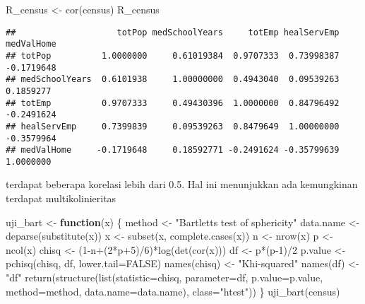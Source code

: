 \documentclass[
]{article}
\newenvironment{Shaded}{\begin{snugshade}}{\end{snugshade}}
\newcommand{\AttributeTok}[1]{\textcolor[rgb]{0.77,0.63,0.00}{#1}}
\newcommand{\ConstantTok}[1]{\textcolor[rgb]{0.00,0.00,0.00}{#1}}
\newcommand{\ControlFlowTok}[1]{\textcolor[rgb]{0.13,0.29,0.53}{\textbf{#1}}}
\newcommand{\DecValTok}[1]{\textcolor[rgb]{0.00,0.00,0.81}{#1}}
\newcommand{\FunctionTok}[1]{\textcolor[rgb]{0.00,0.00,0.00}{#1}}
\newcommand{\NormalTok}[1]{#1}
\newcommand{\OtherTok}[1]{\textcolor[rgb]{0.56,0.35,0.01}{#1}}
\newcommand{\SpecialCharTok}[1]{\textcolor[rgb]{0.00,0.00,0.00}{#1}}
\newcommand{\StringTok}[1]{\textcolor[rgb]{0.31,0.60,0.02}{#1}}
\begin{document}
\begin{Shaded}
\begin{Highlighting}[]
\NormalTok{R\_census }\OtherTok{\textless{}{-}} \FunctionTok{cor}\NormalTok{(census)}
\NormalTok{R\_census}
\end{Highlighting}
\end{Shaded}

\begin{verbatim}
##                    totPop medSchoolYears     totEmp healServEmp medValHome
## totPop          1.0000000     0.61019384  0.9707333  0.73998387 -0.1719648
## medSchoolYears  0.6101938     1.00000000  0.4943040  0.09539263  0.1859277
## totEmp          0.9707333     0.49430396  1.0000000  0.84796492 -0.2491624
## healServEmp     0.7399839     0.09539263  0.8479649  1.00000000 -0.3579964
## medValHome     -0.1719648     0.18592771 -0.2491624 -0.35799639  1.0000000
\end{verbatim}

terdapat beberapa korelasi lebih dari 0.5. Hal ini menunjukkan ada
kemungkinan terdapat multikolinieritas

\begin{Shaded}
\begin{Highlighting}[]
\NormalTok{uji\_bart }\OtherTok{\textless{}{-}} \ControlFlowTok{function}\NormalTok{(x)}
\NormalTok{\{}
\NormalTok{ method }\OtherTok{\textless{}{-}} \StringTok{"Bartlett\textquotesingle{}s test of sphericity"}
\NormalTok{ data.name }\OtherTok{\textless{}{-}} \FunctionTok{deparse}\NormalTok{(}\FunctionTok{substitute}\NormalTok{(x))}
\NormalTok{ x }\OtherTok{\textless{}{-}} \FunctionTok{subset}\NormalTok{(x, }\FunctionTok{complete.cases}\NormalTok{(x)) }
\NormalTok{ n }\OtherTok{\textless{}{-}} \FunctionTok{nrow}\NormalTok{(x)}
\NormalTok{ p }\OtherTok{\textless{}{-}} \FunctionTok{ncol}\NormalTok{(x)}
\NormalTok{ chisq }\OtherTok{\textless{}{-}}\NormalTok{ (}\DecValTok{1}\SpecialCharTok{{-}}\NormalTok{n}\SpecialCharTok{+}\NormalTok{(}\DecValTok{2}\SpecialCharTok{*}\NormalTok{p}\SpecialCharTok{+}\DecValTok{5}\NormalTok{)}\SpecialCharTok{/}\DecValTok{6}\NormalTok{)}\SpecialCharTok{*}\FunctionTok{log}\NormalTok{(}\FunctionTok{det}\NormalTok{(}\FunctionTok{cor}\NormalTok{(x)))}
\NormalTok{ df }\OtherTok{\textless{}{-}}\NormalTok{ p}\SpecialCharTok{*}\NormalTok{(p}\DecValTok{{-}1}\NormalTok{)}\SpecialCharTok{/}\DecValTok{2}
\NormalTok{ p.value }\OtherTok{\textless{}{-}} \FunctionTok{pchisq}\NormalTok{(chisq, df, }\AttributeTok{lower.tail=}\ConstantTok{FALSE}\NormalTok{)}
 \FunctionTok{names}\NormalTok{(chisq) }\OtherTok{\textless{}{-}} \StringTok{"Khi{-}squared"}
 \FunctionTok{names}\NormalTok{(df) }\OtherTok{\textless{}{-}} \StringTok{"df"}
 \FunctionTok{return}\NormalTok{(}\FunctionTok{structure}\NormalTok{(}\FunctionTok{list}\NormalTok{(}\AttributeTok{statistic=}\NormalTok{chisq, }\AttributeTok{parameter=}\NormalTok{df, }\AttributeTok{p.value=}\NormalTok{p.value, }\AttributeTok{method=}\NormalTok{method, }\AttributeTok{data.name=}\NormalTok{data.name), }\AttributeTok{class=}\StringTok{"htest"}\NormalTok{))}
\NormalTok{\}}
\FunctionTok{uji\_bart}\NormalTok{(census)}
\end{Highlighting}
\end{Shaded}
\end{document}
